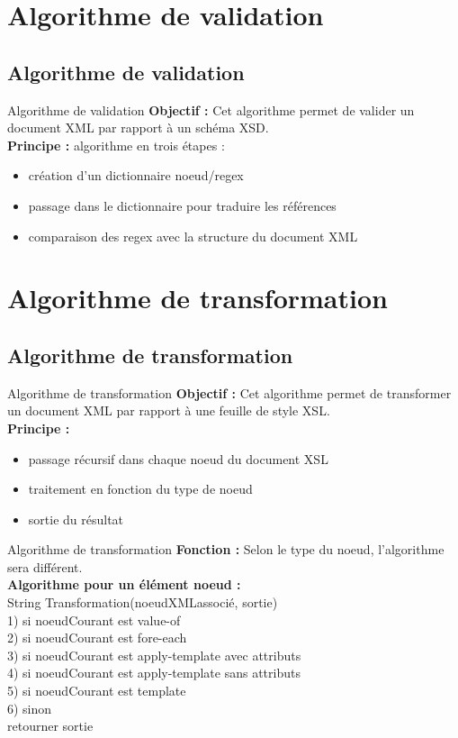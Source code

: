 \documentclass[aspectratio=169]{beamer}
\begin{document}
\section{Algorithme de validation}
\subsection{Algorithme de validation}
\begin{frame}[fragile]{Algorithme de validation}
\textbf{Objectif :}
Cet algorithme permet de valider un document XML par rapport à un schéma XSD. \\
\textbf{Principe :} algorithme en trois étapes :
\begin{itemize}
\item création d'un dictionnaire noeud/regex
\item passage dans le dictionnaire pour traduire les références
\item comparaison des regex avec la structure du document XML
\end{itemize}
\end{frame}

\section{Algorithme de transformation}

\subsection{Algorithme de transformation}
\begin{frame}[fragile]{Algorithme de transformation}
\textbf{Objectif :}
Cet algorithme permet de transformer un document XML par rapport à une feuille de style XSL. \\
\textbf{Principe :}
\begin{itemize}
\item passage récursif dans chaque noeud du document XSL
\item traitement en fonction du type de noeud
\item sortie du résultat
\end{itemize}
\end{frame}

\begin{frame}[fragile]{Algorithme de transformation}
\textbf{Fonction :}
Selon le type du noeud, l'algorithme sera différent. \\
\textbf{Algorithme pour un élément noeud  :}\\
String Transformation(noeudXMLassocié, sortie)\\
  1) si noeudCourant est value-of\\
  2) si noeudCourant est fore-each\\
  3) si noeudCourant est apply-template avec attributs\\
  4) si noeudCourant est apply-template sans attributs\\
  5) si noeudCourant est template\\
  6) sinon\\
retourner sortie
\end{frame}
\end{document}
